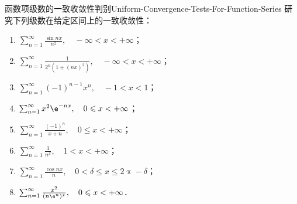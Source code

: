 \begin{problem}{函数项级数的一致收敛性判别}{Uniform-Convergence-Tests-For-Function-Series}
    研究下列级数在给定区间上的一致收敛性：
    \begin{enumerate}
        \item $\sum_{n=1}^\infty \frac{\sin nx}{n^2}, \quad -\infty < x < +\infty$；
        \item $\sum_{n=1}^\infty \frac{1}{2^n(1 + (nx)^2)}, \quad -\infty < x < +\infty$；
        \item $\sum_{n=1}^\infty (-1)^{n-1} x^n, \quad -1 < x < 1$；
        \item $\sum_{n=1}^\infty x^2 \e^{-nx}, \quad 0 \leqslant x < +\infty$；
        \item $\sum_{n=1}^\infty \frac{(-1)^n}{x + n}, \quad 0 \leqslant x < +\infty$；
        \item $\sum_{n=1}^\infty \frac{1}{n^x}, \quad 1 < x < +\infty$；
        \item $\sum_{n=1}^\infty \frac{\cos nx}{n}, \quad 0 < \delta \leqslant x \leqslant 2\uppi - \delta$；
        \item $\sum_{n=1}^\infty \frac{x^2}{(n\e^n)^x}, \quad 0 \leqslant x < +\infty$．
    \end{enumerate}
\end{problem}

